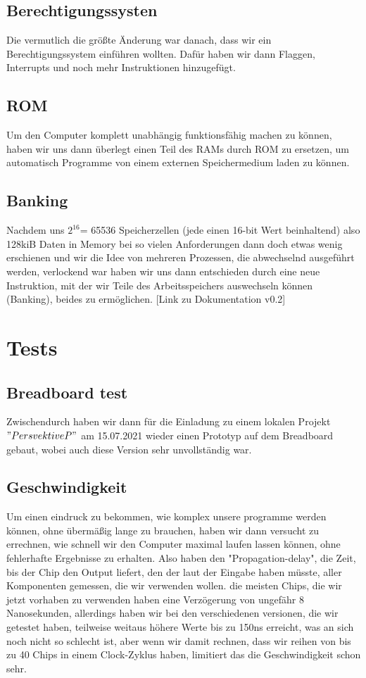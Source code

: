 \documentclass{scrartcl}
\begin{document}
    \subsection{Berechtigungssysten}
    Die vermutlich die größte Änderung war danach, dass wir ein Berechtigungssystem einführen wollten.
    Dafür haben wir dann Flaggen, Interrupts und noch mehr Instruktionen hinzugefügt.
    \subsection{ROM}
    Um den Computer komplett unabhängig funktionsfähig machen zu können, haben wir uns dann überlegt einen Teil des RAMs durch ROM zu ersetzen, um automatisch Programme von einem externen Speichermedium laden zu können.
    \subsection{Banking}
    Nachdem uns $2^{16}$= 65536 Speicherzellen (jede einen 16-bit Wert beinhaltend) also 128kiB Daten in Memory bei so vielen Anforderungen dann doch etwas wenig erschienen
    und wir die Idee von mehreren Prozessen, die abwechselnd ausgeführt werden, verlockend war haben wir uns dann entschieden durch eine neue Instruktion, mit der wir Teile des Arbeitsspeichers auswechseln können (Banking),
    beides zu ermöglichen. [Link zu Dokumentation v0.2]

    \section{Tests}
    \subsection{Breadboard test}
    Zwischendurch haben wir dann für die Einladung zu einem lokalen Projekt $"Persvektive P"$ am 15.07.2021 wieder einen Prototyp auf dem Breadboard gebaut, wobei auch diese Version sehr unvollständig war.

    \subsection{Geschwindigkeit}
    Um einen eindruck zu bekommen, wie komplex unsere programme werden können, ohne übermäßig lange zu brauchen, haben wir dann versucht zu errechnen, wie schnell wir den Computer maximal laufen lassen können, ohne fehlerhafte Ergebnisse zu erhalten.
    Also haben den "Propagation-delay", die Zeit, bis der Chip den Output liefert, den der laut der Eingabe haben müsste, aller Komponenten gemessen, die wir verwenden wollen.
    die meisten Chips, die wir jetzt vorhaben zu verwenden haben eine Verzögerung von ungefähr 8 Nanosekunden, allerdings haben wir bei den verschiedenen versionen, die wir getestet haben, teilweise weitaus höhere Werte bis zu 150ns erreicht, was an sich noch nicht so schlecht ist, aber wenn wir damit rechnen, dass wir reihen von bis zu 40 Chips in einem Clock-Zyklus haben, limitiert das die Geschwindigkeit schon sehr.
\end{document}

